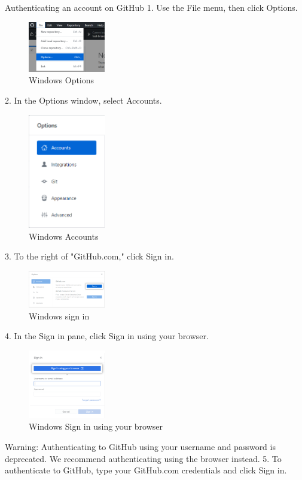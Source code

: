 Authenticating an account on GitHub
1.	Use the File menu, then click Options.
\begin{figure}[ht]
    \centering
    \includegraphics[width=0.3\textwidth]{figures/WIN Options.png}
    \caption{Windows Options }
\end{figure}
2.	In the Options window, select Accounts.
\begin{figure}[ht]
    \centering
    \includegraphics[width=0.3\textwidth]{figures/WIN Accounts.png}
    \caption{Windows Accounts}
\end{figure}
3.	To the right of "GitHub.com," click Sign in.
\begin{figure}[ht]
    \centering
    \includegraphics[width=0.3\textwidth]{figures/WIN Sign in.png}
    \caption{Windows sign in}
\end{figure}
4.	In the Sign in pane, click Sign in using your browser.
\begin{figure}[ht]
    \centering
    \includegraphics[width=0.3\textwidth]{figures/WIN Sign in using your browser.png}
    \caption{Windows Sign in using your browser}
\end{figure}
Warning: Authenticating to GitHub using your username and password is deprecated. We recommend authenticating using the browser instead.
5.	To authenticate to GitHub, type your GitHub.com credentials and click Sign in.
 
